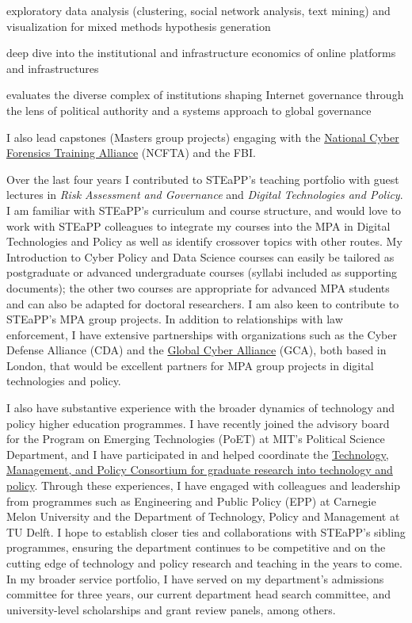 \documentclass[11pt]{letter}
\begin{document}
\begin{letter}
\begin{description}[leftmargin=0.5cm]
  \item[Data Science and Visualization for Policy Analysis:] exploratory data analysis (clustering, social network analysis, text mining) and visualization for mixed methods hypothesis generation

  \item[Internet Infrastructure: Platforms and Politics:] deep dive into the institutional and infrastructure economics of online platforms and infrastructures

  \item[Advanced Cyber Policy:] evaluates the diverse complex of institutions shaping Internet governance through the lens of political authority and a systems approach to global governance
\end{description}
%
I also lead capstones (Masters group projects) engaging with the \href{https://www.ncfta.net}{National Cyber Forensics Training Alliance} (NCFTA) and the FBI.

Over the last four years I contributed to STEaPP's teaching portfolio with guest lectures in \emph{Risk Assessment and Governance} and \emph{Digital Technologies and Policy}.
%
I am familiar with STEaPP's curriculum and course structure, and would love to work with STEaPP colleagues to integrate my courses into the MPA in Digital Technologies and Policy as well as identify crossover topics with other routes.
%
My Introduction to Cyber Policy and Data Science courses can easily be tailored as postgraduate or advanced undergraduate courses (syllabi included as supporting documents); the other two courses are appropriate for advanced MPA students and can also be adapted for doctoral researchers.
%
I am also keen to contribute to STEaPP's MPA group projects.
%
In addition to relationships with law enforcement, I have extensive partnerships with organizations such as the Cyber Defense Alliance (CDA) and the \href{https://www.globalcyberalliance.org/}{Global Cyber Alliance} (GCA), both based in London, that would be excellent partners for MPA group projects in digital technologies and policy.
%

I also have substantive experience with the broader dynamics of technology and policy higher education programmes.
%
I have recently joined the advisory board for the Program on Emerging Technologies (PoET) at MIT's Political Science Department, and I have participated in and helped coordinate the \href{https://tmpconsortium.org/}{Technology, Management, and Policy Consortium for graduate research into technology and policy}.  
%
Through these experiences, I have engaged with colleagues and leadership from programmes such as Engineering and Public Policy (EPP) at Carnegie Melon University and the Department of Technology, Policy and Management at TU Delft.
%
I hope to establish closer ties and collaborations with STEaPP's sibling programmes, ensuring the department continues to be competitive and on the cutting edge of technology and policy research and teaching in the years to come.
%
In my broader service portfolio, I have served on my department's admissions committee for three years, our current department head search committee, and university-level scholarships and grant review panels, among others.


\end{letter}
\end{document}
